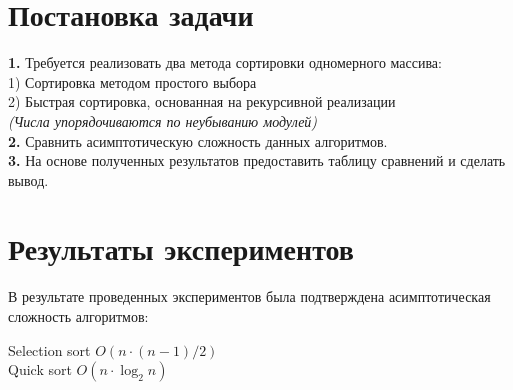 \documentclass[a4paper,10pt]{article}
\begin{document}
    \section{Постановка задачи}
    \vspace{0,5cm}
    \textbf{1.} Требуется реализовать два метода сортировки одномерного массива: \\
    \hspace*{1 cm} 1) Сортировка методом простого выбора \\
    \hspace*{1 cm} 2) Быстрая сортировка, основанная на рекурсивной реализации\\ 
    \hspace*{1.2 cm} \textit{(Числа упорядочиваются по неубыванию модулей)}\\
    \textbf{2.} Сравнить асимптотическую сложность данных алгоритмов. \\
    \textbf{3.} На основе полученных результатов предоставить таблицу сравнений и сделать вывод.
    \vspace{1.3cm}

    \section{Результаты экспериментов}
    \vspace{0.3cm}
    В результате проведенных экспериментов была подтверждена асимптотическая сложность алгоритмов:
    \begin{center}
        Selection sort  $O(n\cdot(n-1)/2)$ \\
        Quick sort  $O(n\cdot\log_2n)$\\
    \end{center}
    
\end{document}
